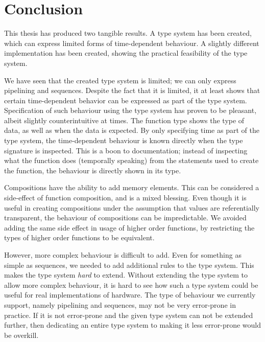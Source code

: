 \chapter{Conclusion}
This thesis has produced two tangible results. 
A type system has been created, which can express limited forms of time-dependent behaviour.
A slightly different implementation has been created, showing the practical feasibility of the type system.

We have seen that the created type system is limited; we can only express pipelining and sequences.
Despite the fact that it is limited, it at least shows that certain time-dependent behavior can be expressed as part of the type system.
Specification of such behaviour using the type system has proven to be pleasant, albeit slightly counterintuitive at times.
The function type shows the type of data, as well as when the data is expected.
By only specifying time as part of the type system, the time-dependent behaviour is known directly when the type signature is inspected.
This is a boon to documentation; instead of inspecting what the function does (temporally speaking) from the statements used to create the function, the behaviour is directly shown in its type.

Compositions have the ability to add memory elements.
This can be considered a side-effect of function composition, and is a mixed blessing.
Even though it is useful in creating compositions under the assumption that values are referentially transparent, the behaviour of compositions can be impredictable.
We avoided adding the same side effect in usage of higher order functions, by restricting the types of higher order functions to be equivalent.
 
However, more complex behaviour is difficult to add.
Even for something as simple as sequences, we needed to add additional rules to the type system.
This makes the type system \textit{hard} to extend.
Without extending the type system to allow more complex behaviour, it is hard to see how such a type system could be useful for real implementations of hardware.
The type of behaviour we currently support, namely pipelining and sequences, may not be very error-prone in practice.
If it is not error-prone and the given type system can not be extended further, then dedicating an entire type system to making it less error-prone would be overkill.

